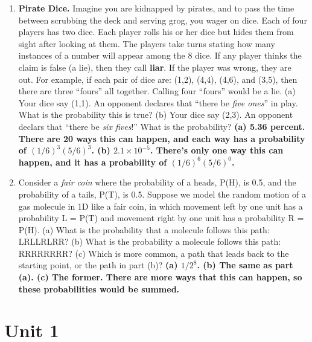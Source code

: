 \documentclass{article}
\begin{document}
\begin{enumerate}
\item \textbf{Pirate Dice.} Imagine you are kidnapped by pirates, and to pass the time between scrubbing the deck and serving grog, you wager on dice.  Each of four players has two dice.  Each player rolls his or her dice but hides them from sight after looking at them.  The players take turns stating how many instances of a number will appear among the 8 dice. If any player thinks the claim is false (a lie), then they call \textbf{liar}.  If the player was wrong, they are out. For example, if each pair of dice are: (1,2), (4,4), (4,6), and (3,5), then there are three ``fours'' all together.  Calling four ``fours'' would be a lie.  (a) Your dice say (1,1).  An opponent declares that ``there be \textit{five ones}'' in play.  What is the probability this is true? (b) Your dice say (2,3).  An opponent declars that ``there be \textit{six fives}!'' What is the probability? \textbf{(a) 5.36 percent.  There are 20 ways this can happen, and each way has a probability of $(1/6)^3 (5/6)^3$. (b) $2.1 \times 10^{-5}$.  There's only one way this can happen, and it has a probability of $(1/6)^6 (5/6)^0$.}
\item Consider a \textit{fair coin} where the probability of a heads, P(H), is 0.5, and the probability of a tails, P(T), is 0.5.  Suppose we model the random motion of a gas molecule in 1D like a fair coin, in which movement left by one unit has a probability L = P(T) and movement right by one unit has a probability R = P(H).  (a) What is the probability that a molecule follows this path: LRLLRLRR? (b) What is the probability a molecule follows this path: RRRRRRRR? (c) Which is more common, a path that leads back to the starting point, or the path in part (b)? \textbf{(a) $1/2^8$. (b) The same as part (a). (c) The former.  There are more ways that this can happen, so these probabilities would be summed.}
\end{enumerate}

\section{Unit 1}
\end{document}
